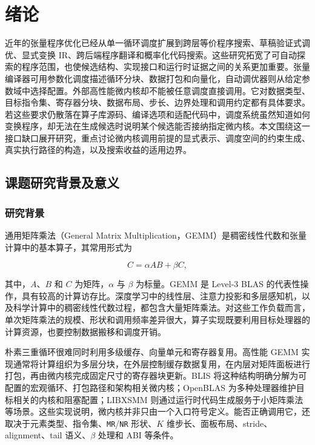 
\chapter{绪论}
\label{chap:introduction}

近年的张量程序优化已经从单一循环调度扩展到跨层等价程序搜索、草稿验证式调优、显式变换 IR、跨后端程序翻译和概率化代码搜索\cite{Wu2025Mirage,Qiao2025Pruner,Luecke2025TransformDialect,Dong2025QiMengXpiler,Jeong2025BayesianCodeDiffusion}。这些研究拓宽了可自动探索的程序范围，也使候选结构、实现接口和运行时证据之间的关系更加重要。张量编译器可用参数化调度描述循环分块、数据打包和向量化，自动调优器则从给定参数域中选择配置。外部高性能微内核却不能被任意调度直接调用。它对数据类型、目标指令集、寄存器分块、数据布局、步长、边界处理和调用约定都有具体要求。若这些要求仍散落在算子库源码、编译选项和适配代码中，调度系统虽然知道如何变换程序，却无法在生成候选时说明某个候选能否接纳指定微内核。本文围绕这一接口缺口展开研究，重点讨论微内核调用前提的显式表示、调度空间的约束生成、真实执行路径的构造，以及搜索收益的适用边界。

\section{课题研究背景及意义}

\subsection{研究背景}

通用矩阵乘法（General Matrix Multiplication，GEMM）是稠密线性代数和张量计算中的基本算子，其常用形式为

\begin{equation}
C = \alpha AB + \beta C,
\label{eq:gemm-definition}
\end{equation}

其中，$A$、$B$ 和 $C$ 为矩阵，$\alpha$ 与 $\beta$ 为标量。GEMM 是 Level-3 BLAS 的代表性操作，具有较高的计算访存比\cite{Dongarra1990Level3}。深度学习中的线性层、注意力投影和多层感知机，以及科学计算中的稠密线性代数过程，都包含大量矩阵乘法。对这些工作负载而言，单次矩阵乘法的规模、形状和调用频率差异很大，算子实现既要利用目标处理器的计算资源，也要控制数据搬移和调度开销。

朴素三重循环很难同时利用多级缓存、向量单元和寄存器复用。高性能 GEMM 实现通常将计算组织为多层分块，在外层控制缓存数据复用，在内层对矩阵面板进行打包，再由微内核完成固定尺寸的寄存器块更新\cite{Goto2008Anatomy}。BLIS 将这种结构明确分解为可配置的宏观循环、打包路径和架构相关微内核\cite{VanZee2015BLIS}；OpenBLAS 为多种处理器维护目标相关的内核和阻塞配置\cite{OpenMathLibOpenBLAS}；LIBXSMM 则通过运行时代码生成服务于小矩阵乘法等场景\cite{Heinecke2016LIBXSMM}。这些实现说明，微内核并非只由一个入口符号定义。能否正确调用它，还取决于元素类型、指令集、\texttt{MR}/\texttt{NR} 形状、$K$ 维步长、面板布局、stride、alignment、tail 语义、$\beta$ 处理和 ABI 等条件。

